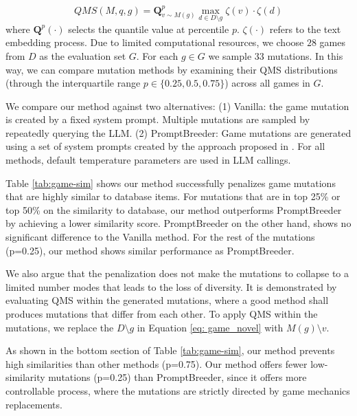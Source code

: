 \begin{equation} 
    QMS(M, q, g) = \mathbf{Q}^p_{v \sim M(g)} \max_{d \in {D \setminus g}} \zeta(v) \cdot \zeta(d) 
    \label{eq: game_novel}
\end{equation}
where $\mathbf{Q}^p(\cdot)$ selects the quantile value at percentile $p$. $\zeta(\cdot)$ refers to the text embedding process. Due to limited computational resources, we choose $28$ games from $D$ as the evaluation set $G$. For each $g \in G$ we sample $33$ mutations.
In this way, we can compare mutation methods by examining their QMS distributions (through the interquartile range $p \in \{0.25,0.5,0.75\}$) across all games in $G$.

We compare our method against two alternatives: (1) Vanilla: the game mutation is created by a fixed system prompt. Multiple mutations are sampled by repeatedly querying the LLM. (2) PromptBreeder: Game mutations are generated using a set of system prompts created by the approach proposed in \cite{fernando_promptbreeder_2023}. For all methods, default temperature parameters are used in LLM callings.

Table \ref{tab:game-sim} shows our method successfully penalizes game mutations that are highly similar to database items. For mutations that are in top 25\% or top 50\% on the similarity to database, our method outperforms PromptBreeder by achieving a lower similarity score. PromptBreeder on the other hand, shows no significant difference to the Vanilla method.
For the rest of the mutations (p=0.25), our method shows similar performance as PromptBreeder.

We also argue that the penalization does not make the mutations to collapse to a limited number modes that leads to the loss of diversity. It is demonstrated by evaluating QMS within the generated mutations, where a good method shall produces mutations that differ from each other. To apply QMS within the mutations, we replace the $D \setminus g$ in Equation \ref{eq: game_novel} with $M(g) \setminus v$.

As shown in the bottom section of Table \ref{tab:game-sim}, our method prevents high similarities than other methods (p=0.75). Our method offers fewer low-similarity mutations (p=0.25) than PromptBreeder, since it offers more controllable process, where the mutations are strictly directed by game mechanics replacements.

